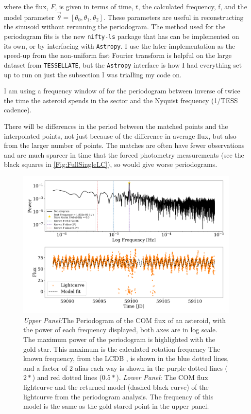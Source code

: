 \documentclass{UCreport}
\begin{document}
where the flux, $F$, is given in terms of time, $t$, the calculated frequency, f, and the model parameter $\vec{\theta} = [\theta_0, \theta_1,\theta_2]$.
These parameters are useful in reconstructing the sinusoid without rerunning the periodogram.
The method used for the periodogram fits is the new \texttt{nifty-ls} package \citep{Garrison2024} that has can be implemented on its own, or by interfacing with \texttt{Astropy}.
I use the later implementation as the speed-up from the non-uniform fast Fourier transform is helpful on the large dataset from \texttt{TESSELLATE}, but the \texttt{Astropy} interface is how I had everything set up to run on just the subsection I was trialling my code on.

I am using a frequency window of for the periodogram between inverse of twice the time the asteroid spends in the sector and the Nyquist frequency (1/TESS cadence). %

There will be differences in the period between the matched points and the interpolated points, not just because of the difference in average flux, but also from the larger number of points. 
The matches are often have fewer observations and are much sparcer in time that the forced photometry measurements (see the black squares in \autoref{Fig:FullSingleLC}), so would give worse periodograms. 



\begin{figure}
  \centering
  \includegraphics[width=\textwidth]{../OzData/PeriodogramUlysses.pdf}
  \caption[Periodogram example]{\textit{Upper Panel}:The Periodogram of the COM flux of an asteroid, with the power of each frequency displayed, both axes are in log scale. 
  The maximum power of the periodogram is highlighted with the gold star. 
  This maximum is the calculated rotation frequency
  The known frequency, from the LCDB \citep{Warner2009}, is shown in the blue dotted lines, and a factor of 2 alias each way is shown in the purple dotted lines ($2*$) and red dotted lines ($0.5*$). 
  \textit{Lower Panel}: The COM flux lightcurve and the returned model (dashed black curve) of the lightcurve from the periodogram analysis. The frequency of this model is the same as the gold stared point in the upper panel.
  }
  \label{Fig:PeriodEx}
\end{figure}
\end{document}
